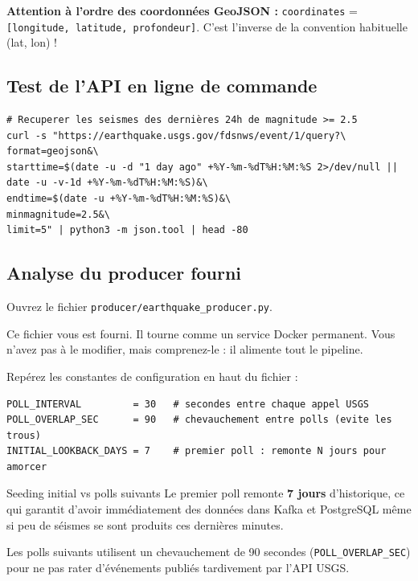 \documentclass[12pt,a4paper]{article}
\begin{document}
\begin{warningbox}
  \textbf{Attention à l'ordre des coordonnées GeoJSON :}
  \texttt{coordinates} = \texttt{[longitude, latitude, profondeur]}.
  C'est l'inverse de la convention habituelle (lat, lon) !
\end{warningbox}

\subsection{Test de l'API en ligne de commande}

\begin{lstlisting}[style=bash, caption={Appel curl vers l'API USGS}]
# Recuperer les seismes des dernières 24h de magnitude >= 2.5
curl -s "https://earthquake.usgs.gov/fdsnws/event/1/query?\
format=geojson&\
starttime=$(date -u -d "1 day ago" +%Y-%m-%dT%H:%M:%S 2>/dev/null || date -u -v-1d +%Y-%m-%dT%H:%M:%S)&\
endtime=$(date -u +%Y-%m-%dT%H:%M:%S)&\
minmagnitude=2.5&\
limit=5" | python3 -m json.tool | head -80
\end{lstlisting}

\subsection{Analyse du producer fourni}

Ouvrez le fichier \texttt{producer/earthquake\_producer.py}.

\begin{fournibox}
  Ce fichier vous est fourni. Il tourne comme un service Docker permanent.
  Vous n'avez pas à le modifier, mais comprenez-le : il alimente tout le pipeline.
\end{fournibox}

Repérez les constantes de configuration en haut du fichier :

\begin{lstlisting}[style=python, caption={Constantes du producer}]
POLL_INTERVAL         = 30   # secondes entre chaque appel USGS
POLL_OVERLAP_SEC      = 90   # chevauchement entre polls (evite les trous)
INITIAL_LOOKBACK_DAYS = 7    # premier poll : remonte N jours pour amorcer
\end{lstlisting}

\begin{conceptbox}{Seeding initial vs polls suivants}
  Le premier poll remonte \textbf{7 jours} d'historique, ce qui garantit d'avoir
  immédiatement des données dans Kafka et PostgreSQL même si peu de séismes
  se sont produits ces dernières minutes.

  Les polls suivants utilisent un chevauchement de 90 secondes (\texttt{POLL\_OVERLAP\_SEC})
  pour ne pas rater d'événements publiés tardivement par l'API USGS.
\end{conceptbox}
\end{document}
